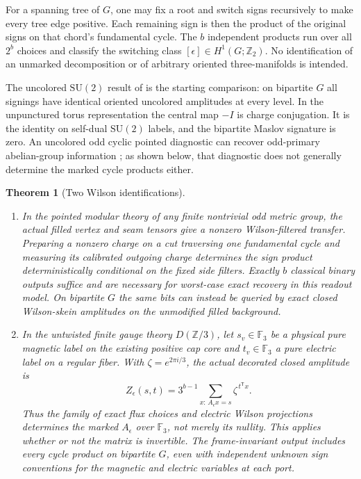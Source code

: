 \documentclass[11pt]{article}
\newtheorem{theorem}{Theorem}
\newcommand{\F}{\mathbb F_3}
\newcommand{\Z}{\mathbb Z}
\begin{document}
For a spanning tree of \(G\), one may fix a root and switch signs recursively to make every tree edge positive. Each remaining sign is then the product of the original signs on that chord's fundamental cycle. The \(b\) independent products run over all \(2^b\) choices and classify the switching class \([\epsilon]\in H^1(G;\Z_2)\). No identification of an unmarked decomposition or of arbitrary oriented three-manifolds is intended.

The uncolored \(\mathrm{SU}(2)\) result of \cite{p50b} is the starting comparison: on bipartite \(G\) all signings have identical oriented uncolored amplitudes at every level. In the unpunctured torus representation the central map \(-I\) is charge conjugation. It is the identity on self-dual \(\mathrm{SU}(2)\) labels, and the bipartite Maslov signature is zero. An uncolored odd cyclic pointed diagnostic can recover odd-primary abelian-group information \cite{moo,p50b}; as shown below, that diagnostic does not generally determine the marked cycle products either.

\begin{theorem}[Two Wilson identifications]\label{thm:main}
\leavevmode
\begin{enumerate}
\item In the pointed modular theory of any finite nontrivial odd metric group, the actual filled vertex and seam tensors give a nonzero Wilson-filtered transfer. Preparing a nonzero charge on a cut traversing one fundamental cycle and measuring its calibrated outgoing charge determines the sign product deterministically conditional on the fixed side filters. Exactly \(b\) classical binary outputs suffice and are necessary for worst-case exact recovery in this readout model. On bipartite \(G\) the same bits can instead be queried by exact closed Wilson-skein amplitudes on the unmodified filled background.
\item In the untwisted finite gauge theory \(D(\Z/3)\), let \(s_v\in\F\) be a physical pure magnetic label on the existing positive cap core and \(t_v\in\F\) a pure electric label on a regular fiber. With \(\zeta=e^{2\pi i/3}\), the actual decorated closed amplitude is
\begin{equation}
 Z_\epsilon(s,t)=3^{b-1}\sum_{x:\,A_\epsilon x=s}\zeta^{\,t^{\mathsf T}x}.
 \label{eq:sum0}
\end{equation}
Thus the family of exact flux choices and electric Wilson projections determines the marked \(A_\epsilon\) over \(\F\), not merely its nullity. This applies whether or not the matrix is invertible. The frame-invariant output includes every cycle product on bipartite \(G\), even with independent unknown sign conventions for the magnetic and electric variables at each port.
\end{enumerate}
\end{theorem}
\end{document}

